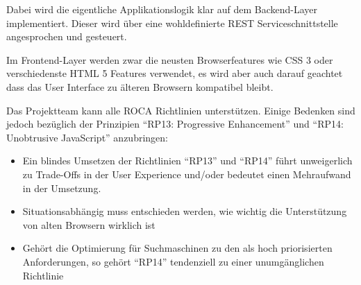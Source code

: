 Dabei wird die eigentliche Applikationslogik klar auf dem Backend-Layer implementiert. Dieser wird über eine wohldefinierte REST Serviceschnittstelle  angesprochen und gesteuert.

Im Frontend-Layer werden zwar die neusten Browserfeatures wie CSS 3 oder verschiedenste HTML 5 Features verwendet, es wird aber auch darauf geachtet dass das User Interface zu älteren Browsern kompatibel bleibt.

Das Projektteam kann alle ROCA Richtlinien unterstützen. Einige Bedenken sind jedoch bezüglich der Prinzipien ``RP13: Progressive Enhancement'' und ``RP14: Unobtrusive JavaScript'' anzubringen:

\begin{itemize}
	\item Ein blindes Umsetzen der Richtlinien ``RP13'' und ``RP14'' führt unweigerlich zu Trade-Offs in der User Experience und/oder bedeutet einen Mehraufwand in der Umsetzung.
	\item Situationsabhängig muss entschieden werden, wie wichtig die Unterstützung von alten Browsern wirklich ist
	\item Gehört die Optimierung für Suchmaschinen zu den als hoch priorisierten Anforderungen, so gehört ``RP14'' tendenziell zu einer unumgänglichen Richtlinie
\end{itemize}
